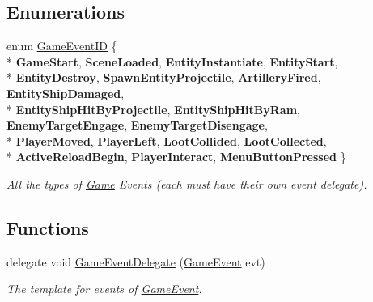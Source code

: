 \subsection*{Enumerations}
\begin{DoxyCompactItemize}
\item 
enum \hyperlink{namespace_skyrates_1_1_game_1_1_event_ad31565d2f03f234f8f77ebf23ff8f150}{Game\-Event\-I\-D} \{ \\*
{\bfseries Game\-Start}, 
{\bfseries Scene\-Loaded}, 
{\bfseries Entity\-Instantiate}, 
{\bfseries Entity\-Start}, 
\\*
{\bfseries Entity\-Destroy}, 
{\bfseries Spawn\-Entity\-Projectile}, 
{\bfseries Artillery\-Fired}, 
{\bfseries Entity\-Ship\-Damaged}, 
\\*
{\bfseries Entity\-Ship\-Hit\-By\-Projectile}, 
{\bfseries Entity\-Ship\-Hit\-By\-Ram}, 
{\bfseries Enemy\-Target\-Engage}, 
{\bfseries Enemy\-Target\-Disengage}, 
\\*
{\bfseries Player\-Moved}, 
{\bfseries Player\-Left}, 
{\bfseries Loot\-Collided}, 
{\bfseries Loot\-Collected}, 
\\*
{\bfseries Active\-Reload\-Begin}, 
{\bfseries Player\-Interact}, 
{\bfseries Menu\-Button\-Pressed}
 \}
\begin{DoxyCompactList}\small\item\em All the types of \hyperlink{class_game}{Game} Events (each must have their own event delegate). \end{DoxyCompactList}\end{DoxyCompactItemize}
\subsection*{Functions}
\begin{DoxyCompactItemize}
\item 
delegate void \hyperlink{namespace_skyrates_1_1_game_1_1_event_a06bcdcadb00cfbf4d4ebd1b2e6ad623d}{Game\-Event\-Delegate} (\hyperlink{class_skyrates_1_1_game_1_1_event_1_1_game_event}{Game\-Event} evt)
\begin{DoxyCompactList}\small\item\em The template for events of \hyperlink{class_skyrates_1_1_game_1_1_event_1_1_game_event}{Game\-Event}. \end{DoxyCompactList}\end{DoxyCompactItemize}


